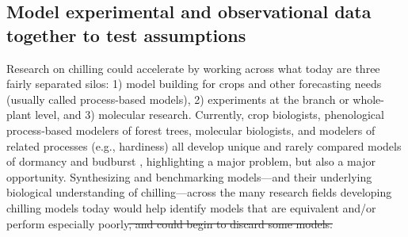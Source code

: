 \documentclass[11pt]{article}
\providecommand{\DIFadd}[1]{{\protect\color{blue}\uwave{#1}}} %
\providecommand{\DIFdel}[1]{{\protect\color{red}\sout{#1}}}                      %
\providecommand{\DIFaddbegin}{} %
\providecommand{\DIFaddend}{} %
\providecommand{\DIFdelbegin}{} %
\providecommand{\DIFdelend}{} %
\newcommand{\DIFscaledelfig}{0.5}
\newlength{\DIFdelgraphicswidth} %
\newlength{\DIFdelgraphicsheight} %
\newcommand{\DIFaddincludegraphics}[2][]{{\color{blue}\fbox{\DIFOincludegraphics[#1]{#2}}}} %
\newcommand{\DIFdelincludegraphics}[2][]{%
\sbox{\DIFdelgraphicsbox}{\DIFOincludegraphics[#1]{#2}}%
\settoboxwidth{\DIFdelgraphicswidth}{\DIFdelgraphicsbox} %
\settoboxtotalheight{\DIFdelgraphicsheight}{\DIFdelgraphicsbox} %
\scalebox{\DIFscaledelfig}{%
\parbox[b]{\DIFdelgraphicswidth}{\usebox{\DIFdelgraphicsbox}\\[-\baselineskip] \rule{\DIFdelgraphicswidth}{0em}}\llap{\resizebox{\DIFdelgraphicswidth}{\DIFdelgraphicsheight}{%
\setlength{\unitlength}{\DIFdelgraphicswidth}%
\begin{picture}(1,1)%
\thicklines\linethickness{2pt} %
{\color[rgb]{1,0,0}\put(0,0){\framebox(1,1){}}}%
{\color[rgb]{1,0,0}\put(0,0){\line( 1,1){1}}}%
{\color[rgb]{1,0,0}\put(0,1){\line(1,-1){1}}}%
\end{picture}%
}\hspace*{3pt}}} %
} %
\DeclareRobustCommand{\DIFaddbegin}{\DIFOaddbegin \let\includegraphics\DIFaddincludegraphics} %
\DeclareRobustCommand{\DIFaddend}{\DIFOaddend \let\includegraphics\DIFOincludegraphics} %
\DeclareRobustCommand{\DIFdelbegin}{\DIFOdelbegin \let\includegraphics\DIFdelincludegraphics} %
\DeclareRobustCommand{\DIFdelend}{\DIFOaddend \let\includegraphics\DIFOincludegraphics} %
\begin{document}
\subsection*{Model experimental and observational data together to test assumptions} 
Research on chilling could accelerate by working across what today are three fairly separated silos: 1) model building for crops and other forecasting needs (usually called process-based models), 2) experiments at the branch or whole-plant level, and 3) molecular research. Currently, crop biologists, phenological process-based modelers of forest trees, molecular biologists, and modelers of related processes (e.g., hardiness) 
all develop unique and rarely compared models of dormancy and budburst \citep[but see][]{kovaleskipreprint}, highlighting a major problem, but also a major opportunity. Synthesizing and benchmarking models---and their underlying biological understanding of chilling---across the many research fields developing chilling models today would help identify models that are equivalent and/or perform especially poorly\DIFdelbegin \DIFdel{, and could begin to discard some models. %
}\DIFdelend \DIFaddbegin \DIFadd{. %
}\DIFaddend 
\end{document}
